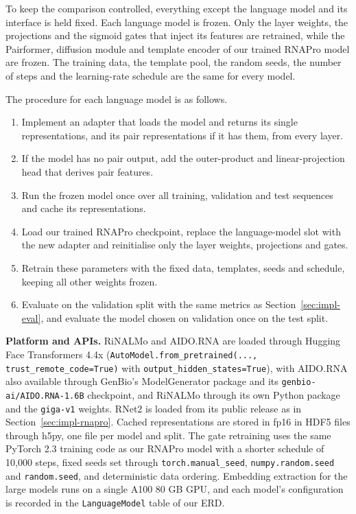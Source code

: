 \documentclass{FastFyp}
\begin{document}
To keep the comparison controlled, everything except the language model and its interface is held fixed. Each language model is frozen. Only the layer weights, the projections and the sigmoid gates that inject its features are retrained, while the Pairformer, diffusion module and template encoder of our trained RNAPro model are frozen. The training data, the template pool, the random seeds, the number of steps and the learning-rate schedule are the same for every model.

The procedure for each language model is as follows.

\begin{enumerate}
\item Implement an adapter that loads the model and returns its single representations, and its pair representations if it has them, from every layer.
\item If the model has no pair output, add the outer-product and linear-projection head that derives pair features.
\item Run the frozen model once over all training, validation and test sequences and cache its representations.
\item Load our trained RNAPro checkpoint, replace the language-model slot with the new adapter and reinitialise only the layer weights, projections and gates.
\item Retrain these parameters with the fixed data, templates, seeds and schedule, keeping all other weights frozen.
\item Evaluate on the validation split with the same metrics as Section~\ref{sec:impl-eval}, and evaluate the model chosen on validation once on the test split.
\end{enumerate}

\textbf{Platform and APIs.} RiNALMo and AIDO.RNA are loaded through Hugging Face Transformers 4.4x (\texttt{AutoModel.from\_pretrained(..., trust\_remote\_code=True)} with \texttt{output\_hidden\_states=True}), with AIDO.RNA also available through GenBio's ModelGenerator package and its \texttt{genbio-ai/AIDO.RNA-1.6B} checkpoint, and RiNALMo through its own Python package and the \texttt{giga-v1} weights. RNet2 is loaded from its public release as in Section~\ref{sec:impl-rnapro}. Cached representations are stored in fp16 in HDF5 files through h5py, one file per model and split. The gate retraining uses the same PyTorch 2.3 training code as our RNAPro model with a shorter schedule of 10,000 steps, fixed seeds set through \texttt{torch.manual\_seed}, \texttt{numpy.random.seed} and \texttt{random.seed}, and deterministic data ordering. Embedding extraction for the large models runs on a single A100 80 GB GPU, and each model's configuration is recorded in the \texttt{LanguageModel} table of our ERD.
\end{document}
